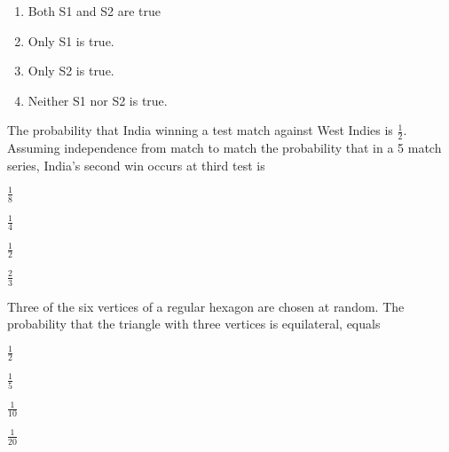 	\begin{enumerate}
		\item Both S1 and S2 are true \item Only S1 is true. \item Only S2 is true. \item Neither S1 nor S2 is true.
	\end{enumerate}
\item The probability that India winning a test match against West Indies is $\frac{1}{2}$. Assuming independence from match to match the probability that in a 5 match series, India's second win occurs at third test is \hfill{}
	\begin{enumerate}
	\end{enumerate}
\item Three of the six vertices of a regular hexagon are chosen at random. The probability that the triangle with three vertices is equilateral, equals \hfill{}
	\begin{enumerate}
			\begin{multicols}{4}
			\item $\frac{1}{2}$ \item $\frac{1}{5}$ \item $\frac{1}{10}$ \item $\frac{1}{20}$
			\end{multicols}
	\end{enumerate}

